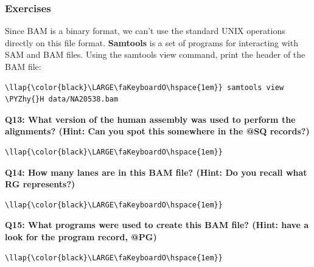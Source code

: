 \documentclass[11pt]{article}
\def\PYZhy{\char`\-}
\begin{document}
    \hypertarget{exercises}{%
\subsubsection{Exercises}\label{exercises}}

Since BAM is a binary format, we can't use the standard UNIX operations
directly on this file format. \textbf{Samtools} is a set of programs for
interacting with SAM and BAM files. Using the samtools view command,
print the header of the BAM file:

\begin{terminalinput}
\begin{Verbatim}[commandchars=\\\{\}]
\llap{\color{black}\LARGE\faKeyboardO\hspace{1em}} samtools view \PYZhy{}H data/NA20538.bam
\end{Verbatim}
\end{terminalinput}

    \textbf{Q13: What version of the human assembly was used to perform the
alignments? (Hint: Can you spot this somewhere in the @SQ records?)}

\begin{terminalinput}
\begin{Verbatim}[commandchars=\\\{\}]
\llap{\color{black}\LARGE\faKeyboardO\hspace{1em}}
\end{Verbatim}
\end{terminalinput}

    \textbf{Q14: How many lanes are in this BAM file? (Hint: Do you recall
what RG represents?)}

\begin{terminalinput}
\begin{Verbatim}[commandchars=\\\{\}]
\llap{\color{black}\LARGE\faKeyboardO\hspace{1em}}
\end{Verbatim}
\end{terminalinput}

    \textbf{Q15: What programs were used to create this BAM file? (Hint:
have a look for the program record, @PG)}

\begin{terminalinput}
\begin{Verbatim}[commandchars=\\\{\}]
\llap{\color{black}\LARGE\faKeyboardO\hspace{1em}}
\end{Verbatim}
\end{terminalinput}
\end{document}
